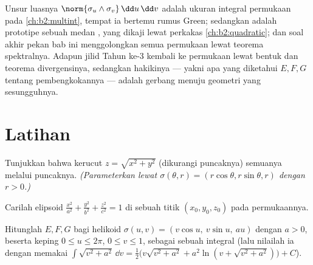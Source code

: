 \begin{remark}
Unsur luasnya $\norm{\sigma_u\wedge\sigma_v}\,\dd u\,\dd v$
adalah ukuran integral permukaan pada \cref{ch:b2:multint}, tempat
ia bertemu rumus Green; sedangkan  adalah
prototipe sebuah medan , yang dikaji 
lewat perkakas \cref{ch:b2:quadratic}; dan soal akhir pekan bab
ini menggolongkan semua permukaan  lewat teorema
spektralnya. Adapun jilid Tahun ke-3 kembali ke permukaan lewat
bentuk  dan teorema divergensinya, sedangkan 
hakikinya --- yakni apa yang diketahui $E, F, G$ tentang pembengkokannya --- adalah
gerbang menuju geometri  yang sesungguhnya.
\end{remark}

\section{Latihan}

\begin{exercise}[$\star$]\label{exo:b2:surfaces:1}
Tunjukkan bahwa  kerucut $z = \sqrt{x^2 + y^2}$
(dikurangi puncaknya) semuanya melalui puncaknya. \emph{(Parameterkan lewat
$\sigma(\theta, r) = (r\cos\theta, r\sin\theta, r)$ dengan $r > 0$.)}
\end{exercise}

\begin{exercise}[$\star$]\label{exo:b2:surfaces:2}
Carilah  elipsoid $\frac{x^2}{a^2} +
\frac{y^2}{b^2} + \frac{z^2}{c^2} = 1$ di sebuah titik $(x_0, y_0,
z_0)$ pada permukaannya.
\end{exercise}

\begin{exercise}[$\star$]\label{exo:b2:surfaces:3}
Hitunglah $E, F, G$ bagi helikoid $\sigma(u, v) = (v\cos u,\
v\sin u,\ au)$ dengan $a > 0$, beserta  keping $0 \leq u \leq
2\pi$, $0 \leq v \leq 1$, sebagai sebuah integral (lalu nilailah ia dengan memakai
$\int\sqrt{v^2 + a^2}\,\dd v = \frac12\bigl(v\sqrt{v^2+a^2} +
a^2\ln(v + \sqrt{v^2 + a^2})\bigr) + C$).
\end{exercise}

